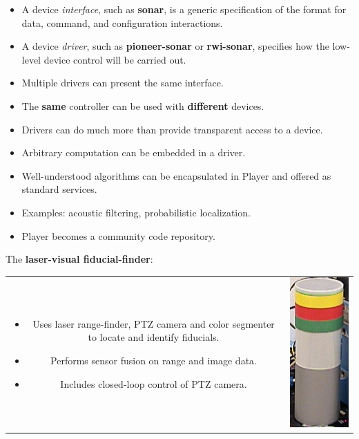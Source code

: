 \documentclass[30pt,landscape,magscalefonts]{foils}
\newcommand{\foilheadc}[1]{\foilhead{\Large \textcolor{myred}{#1}}\vspace*{-2em}}
\newenvironment{xitemize}{\begin{itemize} \itemsep 1pt}{\end{itemize}}
\def\movieroot{file:///mnt/win/users/gerkey/videos}
\begin{document}
\foilheadc{Interfaces vs.\ drivers}
\begin{xitemize}
\item A device {\em interface}, such as {\bf sonar}, is a generic
specification of the format for data, command, and configuration
interactions.
\item A device {\em driver}, such as {\bf pioneer-sonar} or {\bf
rwi-sonar}, specifies how the low-level device control will be carried
out.
\item Multiple drivers can present the same interface.
\item The {\bf same} controller can be used with {\bf different} devices.
\end{xitemize}

\foilheadc{Sophisticated drivers}
{\small
\begin{itemize}
\item Drivers can do much more than provide transparent access to a device.
\item Arbitrary computation can be embedded in a driver.
\item Well-understood algorithms can be encapsulated in Player and
offered as standard services.
\item Examples: acoustic filtering, probabilistic localization.
\item Player becomes a community code repository.
\end{itemize}
}

\foilheadc{Sophisticated drivers (cont'd)}
The {\bf laser-visual fiducial-finder}:

\begin{tabular}{cc}
\parbox{.7\textwidth}{
\begin{itemize}
\item Uses laser range-finder, PTZ camera and color segmenter to locate and 
identify fiducials.
\item Performs sensor fusion on range and image data.
\item Includes closed-loop control of PTZ camera.
\end{itemize}}
&
\parbox{.3\textwidth}{\href{\movieroot/lvb.avi}{\includegraphics[width=.21\textwidth]{laservisualbeacon2.jpg}}}
\end{tabular}
\end{document}
